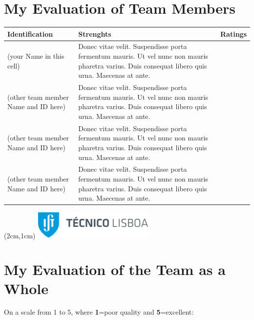 \documentclass[12pt,a4paper]{article}
\begin{document}
\section{My Evaluation of Team Members}          
\begin{table}[htdp]
\footnotesize
\centering
\begin{tabulary}{\linewidth}{|L|L|l|}
\hline
{}Identification & Strenghts & Ratings \\
\hline
(your Name in this cell) & Donec vitae velit. Suspendisse porta fermentum mauris. Ut vel nunc non mauris pharetra varius. Duis consequat libero quis urna. Maecenas at ante. & \\
\hline
(other team member Name and ID here) & Donec vitae velit. Suspendisse porta fermentum mauris. Ut vel nunc non mauris pharetra varius. Duis consequat libero quis urna. Maecenas at ante. & \\

\hline
(other team member Name and ID here) & Donec vitae velit. Suspendisse porta fermentum mauris. Ut vel nunc non mauris pharetra varius. Duis consequat libero quis urna. Maecenas at ante. & \\
\hline
(other team member Name and ID here) & Donec vitae velit. Suspendisse porta fermentum mauris. Ut vel nunc non mauris pharetra varius. Duis consequat libero quis urna. Maecenas at ante. & \\
\hline
\end{tabulary}
\label{tab:team}
\end{table}%
\newpage 
\textblockorigin{-18pt}{-2pt}
\begin{textblock*}{10cm}(2cm,1cm)
\includegraphics[width=6cm]{IST_C_RGB_POS-01-CROP.jpg}
\end{textblock*}
\section{My Evaluation of the Team as a Whole} 
On a scale from 1 to 5, where \textbf{1}=poor quality and \textbf{5}=excellent:
\end{document}
